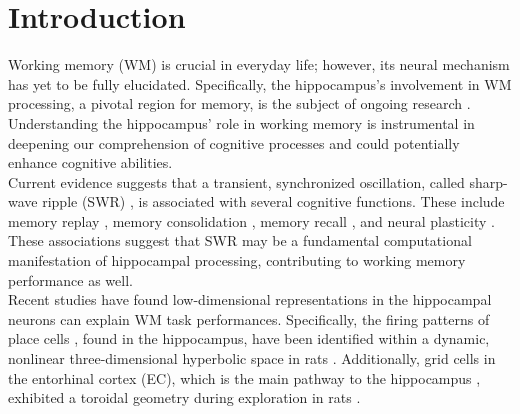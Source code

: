 \documentclass[final,3p,times,twocolumn]{elsarticle}
\begin{document}
\section{Introduction}
Working memory (WM) is crucial in everyday life; however, its neural mechanism has yet to be fully elucidated. Specifically, the hippocampus's involvement in WM processing, a pivotal region for memory, is the subject of ongoing research \cite{scoville_loss_1957} \cite{squire_legacy_2009}  \cite{boran_persistent_2019} \cite{kaminski_persistently_2017} \cite{kornblith_persistent_2017} \cite{faraut_dataset_2018} \cite{borders_hippocampus_2022} \cite{li_functional_2023} \cite{dimakopoulos_information_2022}. Understanding the hippocampus’ role in working memory is instrumental in deepening our comprehension of cognitive processes and could potentially enhance cognitive abilities.
\\
\indent
Current evidence suggests that a transient, synchronized oscillation, called sharp-wave ripple (SWR) \cite{buzsaki_hippocampal_2015}, is associated with several cognitive functions. These include memory replay \cite{wilson_reactivation_1994} \cite{nadasdy_replay_1999} \cite{lee_memory_2002} \cite{diba_forward_2007} \cite{davidson_hippocampal_2009}, memory consolidation \cite{girardeau_selective_2009} \cite{ego-stengel_disruption_2010} \cite{fernandez-ruiz_long-duration_2019} \cite{kim_corticalhippocampal_2022}, memory recall \cite{wu_hippocampal_2017} \cite{norman_hippocampal_2019} \cite{norman_hippocampal_2021}, and neural plasticity \cite{behrens_induction_2005} \cite{norimoto_hippocampal_2018}. These associations suggest that SWR may be a fundamental computational manifestation of hippocampal processing, contributing to working memory performance as well.
\\
\indent
Recent studies have found low-dimensional representations in the hippocampal neurons can explain WM task performances. Specifically, the firing patterns of place cells \cite{okeefe_hippocampus_1971} \cite{okeefe_place_1976} \cite{ekstrom_cellular_2003} \cite{kjelstrup_finite_2008} \cite{harvey_intracellular_2009}, found in the hippocampus, have been identified within a dynamic, nonlinear three-dimensional hyperbolic space in rats \cite{zhang_hippocampal_2022}. Additionally, grid cells in the entorhinal cortex (EC), which is the main pathway to the hippocampus \cite{naber_reciprocal_2001} \cite{van_strien_anatomy_2009} \cite{strange_functional_2014}, exhibited a toroidal geometry during exploration in rats \cite{gardner_toroidal_2022}.
\end{document}
